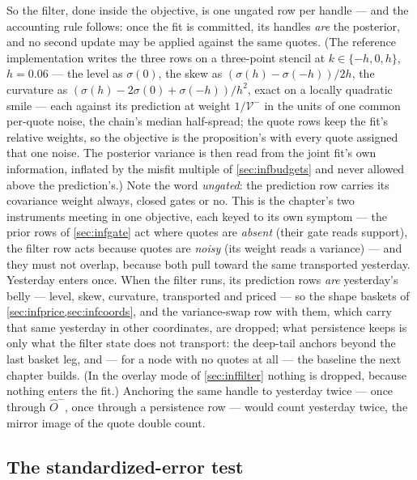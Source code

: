 So the filter, done inside the objective, is one ungated row per
handle --- and the accounting rule follows: once the fit is
committed, its handles \emph{are} the posterior, and no second
update may be applied against the same quotes.  (The reference
implementation writes the three rows on a three-point stencil at
$k\in\{-h,0,h\}$, $h=0.06$ --- the level as $\sigma(0)$, the skew as
$(\sigma(h)-\sigma(-h))/2h$, the curvature as
$(\sigma(h)-2\sigma(0)+\sigma(-h))/h^2$, exact on a locally
quadratic smile --- each against its prediction at weight
$1/\mathcal{V}^{-}$ in the units of one common per-quote noise, the
chain's median half-spread; the quote rows keep the fit's relative
weights, so the objective is the proposition's with every quote
assigned that one noise.  The posterior variance is then read from
the joint fit's own information, inflated by the misfit multiple of
\cref{sec:infbudgets} and never allowed above the prediction's.)
Note the word
\emph{ungated}: the prediction row carries its covariance weight
always, closed gates or no.  This is the chapter's two instruments
meeting in one objective, each keyed to its own symptom --- the
prior rows of \cref{sec:infgate} act where quotes are \emph{absent}
(their gate reads support), the filter row acts because quotes are
\emph{noisy} (its weight reads a variance) --- and they must not
overlap, because both pull toward the same transported yesterday.
Yesterday enters once.  When the filter runs, its prediction rows
\emph{are} yesterday's belly --- level, skew, curvature, transported
and priced --- so the shape baskets of
\cref{sec:infprice,sec:infcoords}, and the variance-swap row with
them, which carry that same yesterday
in other coordinates, are dropped; what persistence keeps is only what
the filter state does not transport: the deep-tail anchors beyond
the last basket leg, and --- for a node with no quotes at all ---
the baseline the next chapter builds.  (In the overlay mode of
\cref{sec:inffilter} nothing is dropped, because nothing enters the
fit.)  Anchoring the same handle to
yesterday twice --- once through $\hat O^{-}$, once through a
persistence row --- would count yesterday twice, the mirror image of
the quote double count.

\subsection{The standardized-error test}

